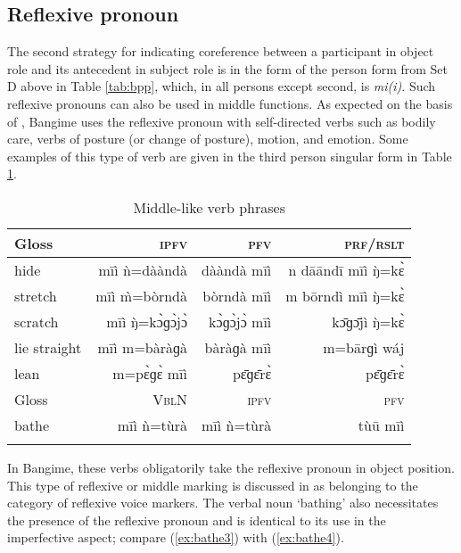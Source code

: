 \documentclass[output=paper]{langscibook}
\begin{document}
\subsection{Reflexive pronoun}
\label{subsec:refpro}
The second strategy for indicating coreference between a participant in object role and its antecedent in subject role is in the form of the person form from Set D above in Table \ref{tab:bpp}, which, in all persons except second, is \textit{mi(i)}. Such reflexive pronouns can also be used in middle functions. As expected on the basis of \cite{Kemmer1994}, Bangime uses the reflexive pronoun with self-directed verbs such as bodily care, verbs of posture (or change of posture), motion, and emotion. Some examples of this type of verb are given in the third person singular form in Table \ref{tab:rv}.
\begin{table}[H]
	\caption{Middle-like verb phrases}
	\label{tab:rv}
	\begin{tabular}{l rrr}
		\lsptoprule
		Gloss & \textsc{ipfv} & \textsc{pfv} & \textsc{prf}/\textsc{rslt} \\ 
		\midrule
		hide  &  mīì ǹ=dààndà  &  dààndà mīì  & n dāāndī mīì ŋ̀=kɛ̀ \\
		stretch  &  mīì m̀=bòrndà  & bòrndà mīì  & m bōrndì mīì ŋ̀=kɛ̀   \\
		scratch & mīì ŋ̀=kɔ̀ɡɔ̀jɔ̀ & kɔ̀ɡɔ̀jɔ̀ mīì & kɔ̄ɡɔ̄jì ŋ̀=kɛ̀ \\
		lie straight & mīì m=bàràɡà & bàràɡà mīì & m=bārɡì wáj \\
		\midrule
		lean & m=pɛ̀ɡɛ̀ mīì & pɛ̄ɡɛ̄rɛ̀ & pɛ̄ɡɛ̄rɛ̀ \\
		\lsptoprule
		Gloss & \textsc{VblN} & \textsc{ipfv} & \textsc{pfv} \\ 
		\midrule
		bathe & mīì ǹ=tùrà & mīì ǹ=tùrà & tùū mīì \\
		\lspbottomrule
	\end{tabular}
\end{table}
In Bangime, these verbs obligatorily take the reflexive pronoun in object position. This type of reflexive or middle marking is discussed in \cite[7]{Haspelmath2019} as belonging to the category of reflexive voice markers. The verbal noun `bathing' also necessitates the presence of the reflexive pronoun and is identical to its use in the imperfective aspect; compare (\ref{ex:bathe3}) with (\ref{ex:bathe4}). 
	\ea \label{ex:bathe3}
\end{document}
